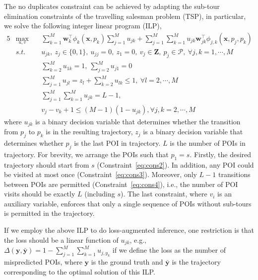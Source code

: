 The no duplicates constraint can be achieved by adapting the sub-tour elimination constraints of the travelling salesman problem (TSP),
in particular, we solve the following integer linear program (ILP),
\begin{alignat}{5}
& \max_{u,v} ~&& \sum_{k=1}^M \mathbf{w}_k^\top \phi_k(\mathbf{x}, p_k) \sum_{j=1}^M u_{jk} + 
                 \sum_{j=1}^M \sum_{k=1}^M u_{jk} \mathbf{w}_{jk}^\top \phi_{j, k}(\mathbf{x}, p_j, p_k) \\
& s.t. ~~ ~&& u_{jk}, ~z_j \in \{0, 1\}, ~u_{jj}=0, ~z_1=0, ~v_j \in \mathbf{Z},~ p_j \in \mathcal{P}, ~\forall j, k = 1,\cdots,M   \label{eq:cons1} \\
&          && \sum_{k=2}^M u_{1k} = 1, ~\sum_{j=2}^M u_{j1} = 0  \label{eq:cons2} \\
&          && \sum_{j=1}^M u_{jl} = z_l + \sum_{k=2}^M u_{lk} \le 1,   ~\forall l=2,\cdots,M                    \label{eq:cons3} \\
&          && \sum_{j=1}^M \sum_{k=1}^M u_{jk} = L-1,                                                           \label{eq:cons4} \\
&          && v_j - v_k + 1 \le (M-1) (1-u_{jk}),                     \forall j,k=2,\cdots,M                    \label{eq:cons5}
\end{alignat}
where $u_{jk}$ is a binary decision variable that determines whether the transition from $p_j$ to $p_k$ is in the resulting trajectory,
$z_j$ is a binary decision variable that determines whether $p_j$ is the last POI in trajectory.
$L$ is the number of POIs in trajectory.
For brevity, we arrange the POIs such that $p_1 = s$.
Firstly, the desired trajectory should start from $s$ (Constraint~\ref{eq:cons2}).
In addition, any POI could be visited at most once (Constraint~\ref{eq:cons3}).
Moreover, only $L-1$ transitions between POIs are permitted (Constraint~\ref{eq:cons4}),
i.e., the number of POI visits should be exactly $L$ (including $s$).
The last constraint, where $v_i$ is an auxiliary variable,
enforces that only a single sequence of POIs without sub-tours is permitted in the trajectory.

If we employ the above ILP to do loss-augmented inference, one restriction is that the loss should be a linear function of $u_{jk}$,
e.g., $\Delta(\mathbf{y}, \bar{\mathbf{y}}) = 1 - \sum_{j=1}^M \sum_{k=1}^M u_{j, y_k}$ if we define the loss as the number of mispredicted POIs,
where $\mathbf{y}$ is the ground truth and $\bar{\mathbf{y}}$ is the trajectory corresponding to the optimal solution of this ILP.

